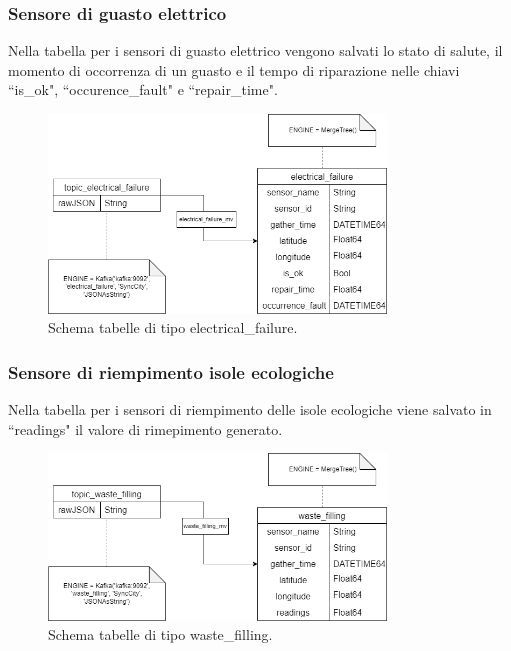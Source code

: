 \documentclass[8pt]{article}
\begin{document}
\subsubsection{Sensore di guasto elettrico}
Nella tabella per i sensori di guasto elettrico vengono salvati lo stato di salute, il momento di occorrenza di un guasto e il tempo di riparazione nelle chiavi ``is\_ok", ``occurence\_fault" e ``repair\_time".
\begin{figure}[h!]
    \centering
    \includegraphics[width=0.8\textwidth]{images_st/tabelle_electrical_failure.png}
    \caption{Schema tabelle di tipo electrical\_failure.}
    \label{fig:Schema tabelle di tipo electrical_failure}
\end{figure}
\subsubsection{Sensore di riempimento isole ecologiche}
Nella tabella per i sensori di riempimento delle isole ecologiche viene salvato in ``readings" il valore di rimepimento generato.
\begin{figure}[h!]
    \centering
    \includegraphics[width=0.8\textwidth]{images_st/tabelle_waste_filling.png}
    \caption{Schema tabelle di tipo waste\_filling.}
    \label{fig:Schema tabelle di tipo waste_filling}
\end{figure}
\clearpage
\end{document}

